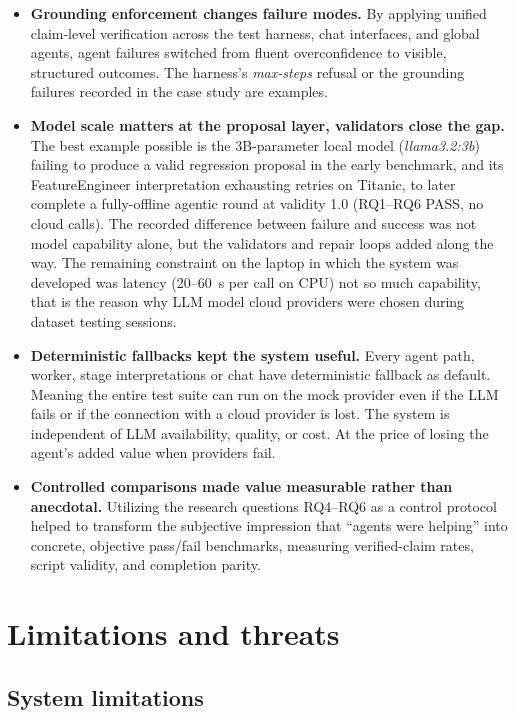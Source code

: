 \begin{itemize}
	\item \textbf{Grounding enforcement changes failure modes.} By applying unified claim-level verification across the test harness, chat interfaces, and global agents, agent failures switched from fluent overconfidence to visible, structured outcomes. The harness's \emph{max-steps} refusal or the grounding failures recorded in the case study are examples.

	\item \textbf{Model scale matters at the proposal layer, validators close the gap.} The best example possible is the 3B-parameter local model (\emph{llama3.2:3b}) failing to produce a valid regression proposal in the early benchmark, and its FeatureEngineer interpretation exhausting retries on Titanic, to later complete a fully-offline agentic round at validity 1.0 (RQ1--RQ6 PASS, no cloud calls). The recorded difference between failure and success was not model capability alone, but the validators and repair loops added along the way. The remaining constraint on the laptop in which the system was developed was latency (20--60~s per call on CPU) not so much capability, that is the reason why LLM model cloud providers were chosen during dataset testing sessions.

	\item \textbf{Deterministic fallbacks kept the system useful.} Every agent path, worker, stage interpretations or chat have deterministic fallback as default. Meaning the entire test suite can run on the mock provider even if the LLM fails or if the connection with a cloud provider is lost. The system is independent of LLM availability, quality, or cost. At the price of losing the agent's added value when providers fail.


	\item \textbf{Controlled comparisons made value measurable rather than anecdotal.} Utilizing the research questions RQ4--RQ6 as a control protocol helped to transform the subjective impression that ``agents were helping'' into concrete, objective pass/fail benchmarks, measuring verified-claim rates, script validity, and completion parity.
\end{itemize}

\section{Limitations and threats}
\label{sec:limitations}

\subsection{System limitations}

